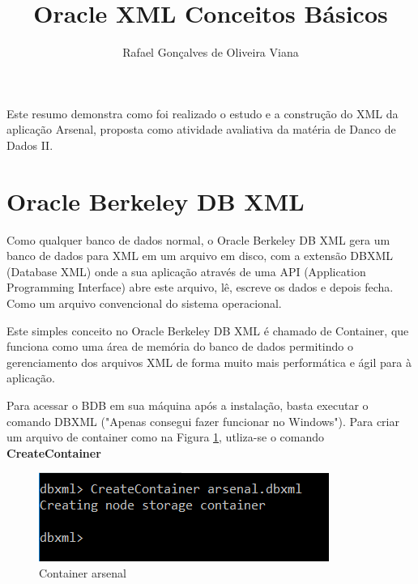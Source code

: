 \documentclass[12pt]{article}
\title{Oracle XML  Conceitos Básicos}
\author{Rafael Gonçalves de Oliveira Viana\inst{1} }
\begin{document}
 

\maketitle


     
\begin{resumo} 
  Este resumo demonstra como foi realizado o estudo e a construção do XML da aplicação Arsenal, proposta como atividade avaliativa da matéria de Danco de Dados II.
  
  
\end{resumo}


\section{Oracle Berkeley DB XML}

Como qualquer banco de dados normal, o Oracle Berkeley DB XML gera um banco de dados para XML em um arquivo em disco, com a extensão DBXML (Database XML) onde a sua aplicação através de uma API (Application Programming Interface) abre este arquivo, lê, escreve os dados e depois fecha. Como um arquivo convencional do sistema operacional.

Este simples conceito no Oracle Berkeley DB XML é chamado de Container, que funciona como uma área de memória  do banco de dados permitindo o gerenciamento dos arquivos XML de forma muito mais performática e ágil para à aplicação.\cite{dbxml}

Para acessar o BDB em sua máquina após a instalação, basta executar o comando DBXML ("Apenas consegui fazer funcionar no Windows"). Para criar um arquivo de container como na Figura \ref{fg1}, utliza-se o comando \textbf{CreateContainer}

	\begin{figure}[!htb]
	\centering
	\includegraphics[scale=0.5]{./imagens/f1.png}
	
	\caption{Container arsenal}
	\label{fg1}
\end{figure}
\end{document}
